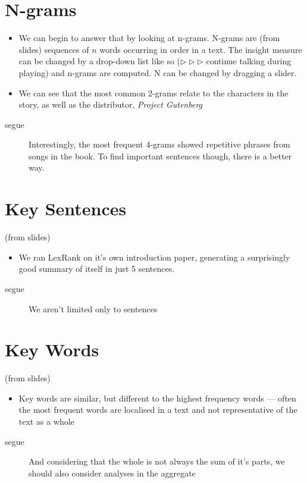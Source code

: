 \documentclass[11pt,a4paper]{article}
\begin{document}
\section{N-grams}
\label{sec:n-grams}
\begin{itemize}
\item We can begin to answer that by looking at n-grams. N-grams are
  (from slides) sequences of \(n\) words occurring in order in a text.
  The insight measure can be changed by a drop-down list like so
  (\(\triangleright \triangleright \triangleright\) continue talking
  during playing) and n-grams are computed. N can be changed by
  dragging a slider.
\item We can see that the most common 2-grams relate to the characters
  in the story, as well as the distributor, \textit{Project Gutenberg}
\end{itemize}
\begin{description}
\item[segue] Interestingly, the most frequent 4-grams showed
  repetitive phrases from songs in the book. To find important
  sentences though, there is a better way.
\end{description}

\section{Key Sentences}
\label{sec:key-sentences}
(from slides)
\begin{itemize}
\item We ran LexRank on it's own introduction paper, generating a
  surprisingly good summary of itself in just 5 sentences.
\end{itemize}
\begin{description}
\item[segue] We aren't limited only to sentences
\end{description}

\section{Key Words}
\label{sec:key-words}
(from slides)
\begin{itemize}
\item Key words are similar, but different to the highest frequency
  words --- often the most frequent words are localised in a text and
  not representative of the text as a whole
\end{itemize}
\begin{description}
\item[segue] And considering that the whole is not always the sum of
  it's parts, we should also consider analyses in the aggregate
\end{description}
\end{document}
